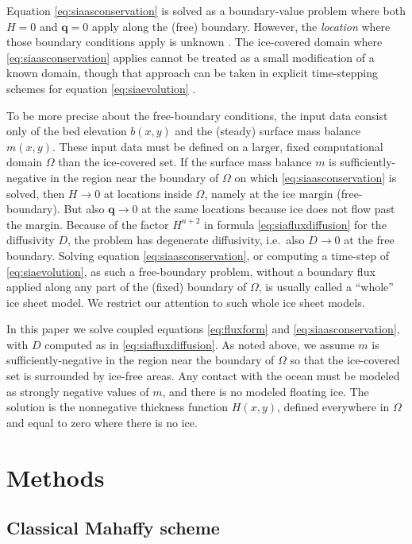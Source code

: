 \documentclass[twocolumn,letterpaper]{igs}
\newcommand\bq{\mathbf{q}}
\begin{document}
Equation \eqref{eq:siaasconservation} is solved as a boundary-value problem where both $H=0$ and $\bq=0$ apply along the (free) boundary.  However, the \emph{location} where those boundary conditions apply is unknown \citep{JouvetBueler2012,JaroschSchoofAnslow2013}.  The ice-covered domain where \eqref{eq:siaasconservation} applies cannot be treated as a small modification of a known domain, though that approach can be taken in explicit time-stepping schemes for equation \eqref{eq:siaevolution} \citep{Huybrechtsetal1996,Bueleretal2005}.

To be more precise about the free-boundary conditions, the input data consist only of the bed elevation $b(x,y)$ and the (steady) surface mass balance $m(x,y)$.  These input data must be defined on a larger, fixed computational domain $\Omega$ than the ice-covered set.  If the surface mass balance $m$ is sufficiently-negative in the region near the boundary of $\Omega$ on which \eqref{eq:siaasconservation} is solved, then $H\to 0$ at locations inside $\Omega$, namely at the ice margin (free-boundary).  But also $\bq \to 0$ at the same locations because ice does not flow past the margin.  Because of the factor $H^{n+2}$ in formula \eqref{eq:siafluxdiffusion} for the diffusivity $D$, the problem has degenerate diffusivity, i.e.~also $D \to 0$ at the free boundary.  Solving equation \eqref{eq:siaasconservation}, or computing a time-step of \eqref{eq:siaevolution}, as such a free-boundary problem, without a boundary flux applied along any part of the (fixed) boundary of $\Omega$, is usually called a ``whole'' ice sheet model.  We restrict our attention to such whole ice sheet models.

In this paper we solve coupled equations \eqref{eq:fluxform} and \eqref{eq:siaasconservation}, with $D$ computed as in \eqref{eq:siafluxdiffusion}.  As noted above, we assume $m$ is sufficiently-negative in the region near the boundary of $\Omega$ so that the ice-covered set is surrounded by ice-free areas.  Any contact with the ocean must be modeled as strongly negative values of $m$, and there is no modeled floating ice.  The solution is the nonnegative thickness function $H(x,y)$, defined everywhere in $\Omega$ and equal to zero where there is no ice.


\section{Methods}

\subsection{Classical Mahaffy scheme}
\end{document}
